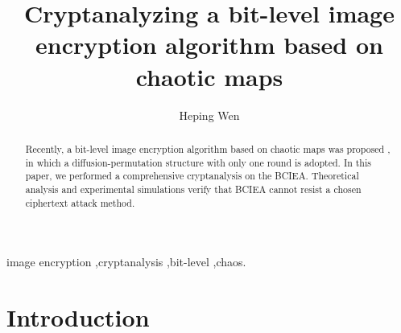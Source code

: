 \documentclass[final,3p,times,twocolumn]{elsarticle}
\begin{document}
\begin{frontmatter}

\title{Cryptanalyzing a bit-level image encryption algorithm based on chaotic maps}

\author[zsi,uestc]{Heping Wen}




\address[zsi]{School of Electronic and Information Engineering, University of Electronic Science and Technology of China, Zhongshan Institute, \\ Zhongshan 528402, China}

\address[uestc]{School of Information and Communication Engineering, University of Electronic Science and Technology of China, Chengdu 611731, China}

\begin{abstract}

Recently, a bit-level image encryption algorithm based on chaotic maps was proposed \cite{LuX2016OLE}, in which a diffusion-permutation structure with only one round is adopted. In this paper, we performed a comprehensive cryptanalysis on the BCIEA. Theoretical analysis and experimental simulations verify that BCIEA cannot resist a chosen ciphertext attack method.


\end{abstract}
\begin{keyword}
image encryption \sep cryptanalysis \sep bit-level \sep chaos.
\end{keyword}
\end{frontmatter}

\section{Introduction}
\label{sec:intro}
\end{document}
